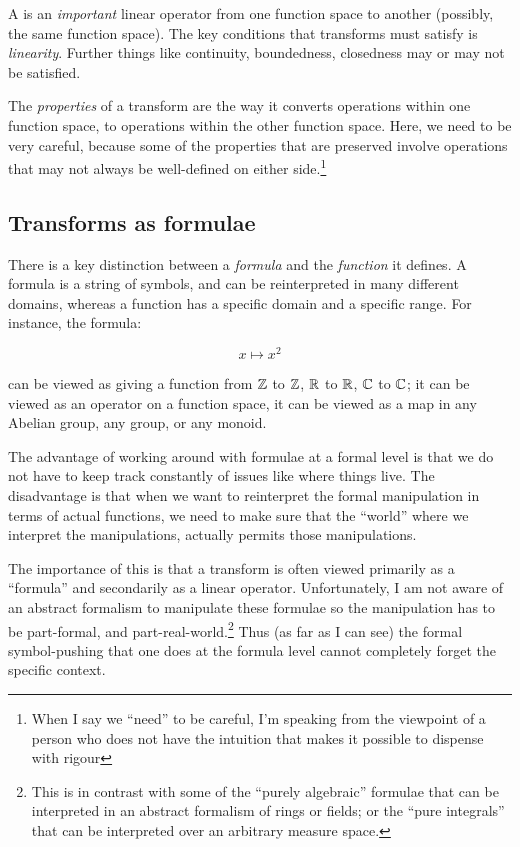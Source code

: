 \documentclass[a4paper]{amsart}
\begin{document}
A  is an {\em important} linear operator from
one function space to another (possibly, the same function space). The
key conditions that transforms must satisfy is {\em
  linearity}. Further things like continuity, boundedness, closedness
may or may not be satisfied.

The {\em properties} of a transform are the way it converts operations
within one function space, to operations within the other function
space. Here, we need to be very careful, because some of the
properties that are preserved involve operations that may not always
be well-defined on either side.\footnote{When I say we ``need'' to be
  careful, I'm speaking from the viewpoint of a person who does not
  have the intuition that makes it possible to dispense with rigour}

\subsection{Transforms as formulae}

There is a key distinction between a {\em formula} and the {\em
  function} it defines. A formula is a string of symbols, and can be
reinterpreted in many different domains, whereas a function has a
specific domain and a specific range. For instance, the formula:

$$x \mapsto x^2$$

can be viewed as giving a function from $\mathbb{Z}$ to $\mathbb{Z}$, $\mathbb{R}$ to $\mathbb{R}$,
$\mathbb{C}$ to $\mathbb{C}$; it can be viewed as an operator on a function space, it
can be viewed as a map in any Abelian group, any group, or any monoid.

The advantage of working around with formulae at a formal level is
that we do not have to keep track constantly of issues like where
things live. The disadvantage is that when we want to reinterpret the
formal manipulation in terms of actual functions, we need to make sure
that the ``world'' where we interpret the manipulations, actually
permits those manipulations.

The importance of this is that a transform is often viewed primarily
as a ``formula'' and secondarily as a linear operator. Unfortunately,
I am not aware of an abstract formalism to manipulate these formulae
so the manipulation has to be part-formal, and
part-real-world.\footnote{This is in contrast with some of the
  ``purely algebraic'' formulae that can be interpreted in an abstract
  formalism of rings or fields; or the ``pure integrals'' that can be
  interpreted over an arbitrary measure space.} Thus (as far as I can
see) the formal symbol-pushing that one does at the formula level
cannot completely forget the specific context.
\end{document}
